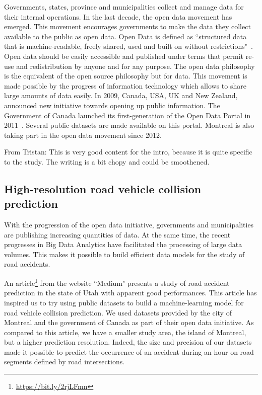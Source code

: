 \documentclass[conference]{IEEEtran}
\newcommand{\TG}[1]{\colorlet{saved}{.}\color{orange}From Tristan: #1\color{saved}}
\begin{document}
Governments, states, province and municipalities collect and manage data for their internal operations. In the last decade, the open data movement has emerged. This movement encourages governments to make the data they collect available to the public as open data.
Open Data is defined as ``structured data that is machine-readable, freely shared, used and built on without restrictions"~\cite{opendata101}. Open data should be easily accessible and published under terms that permit re-use and redistribution by anyone and for any purpose.
The open data philosophy is the equivalent of the open source philosophy but for data.
This movement is made possible by the progress of information technology which allows to share large amounts of data easily. In 2009, Canada, USA, UK and New Zealand, announced new initiative towards opening up public information. The Government of Canada launched its first-generation of the Open Data Portal in 2011~\cite{opendata101}. Several public datasets are made available on this portal. Montreal is also taking part in the open data movement since 2012.

\TG{This is very good content for the intro, because it is quite specific to the study. The writing is a bit chopy and could be smoothened.}

\subsection{High-resolution road vehicle collision prediction}
With the progression of the open data initiative, governments and municipalities are publishing increasing quantities of data. At the same time, the recent progresses in Big Data Analytics have facilitated the processing of large data volumes. This makes it possible to build efficient data models for the study of road accidents.

An article\protect\footnote{\url{https://bit.ly/2rjLFmn}} from the website ``Medium" presents a study of road accident prediction in the state of Utah with apparent good performances. This article has inspired us to try using public datasets to build a machine-learning model for road vehicle collision prediction. We used datasets provided by the city of Montreal and the government of Canada as part of their open data initiative. As compared to this article, we have a smaller study area, the island of Montreal, but a higher prediction resolution. Indeed, the size and precision of our datasets made it possible to predict the occurrence of an accident during an hour on road segments defined by road intersections.
\end{document}
